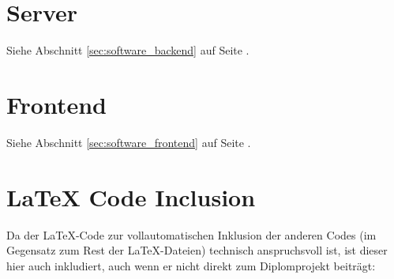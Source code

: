 \section{Server}
\label{lstsec:incl-server}
Siehe Abschnitt \ref{sec:software_backend} auf Seite \pageref{sec:software_backend}.
\newline
{}

\section{Frontend}
\label{lstsec:incl-frontend}
Siehe Abschnitt \ref{sec:software_frontend} auf Seite \pageref{sec:software_frontend}.
\newline
{}

\section{LaTeX Code Inclusion}
\label{lstsec:incl-latex}
Da der LaTeX-Code zur vollautomatischen Inklusion der anderen Codes (im Gegensatz zum Rest der LaTeX-Dateien)
technisch anspruchsvoll ist,
ist dieser hier auch inkludiert,
auch wenn er nicht direkt zum Diplomprojekt beiträgt:

